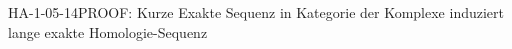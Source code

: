 
\begin{REM}{HA-1-05-14}{PROOF: Kurze Exakte Sequenz in Kategorie der Komplexe induziert lange exakte Homologie-Sequenz}
\end{REM}
